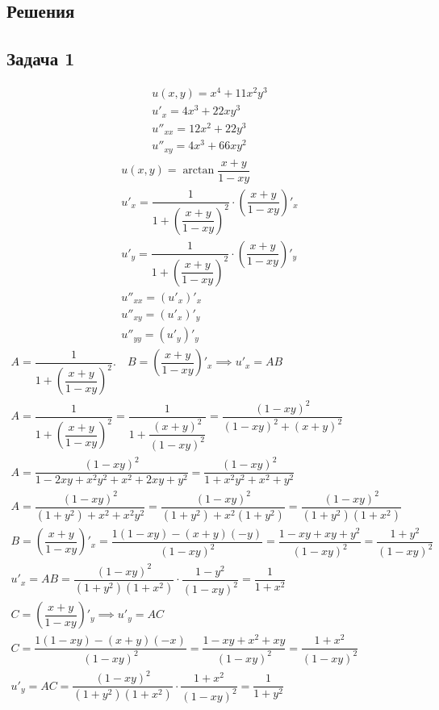 \documentclass[a4paper,fleqn,12pt]{article}
\theoremstyle{definition}
\begin{document}
\newpage
\subsection{Решения}

\subsection*{Задача 1}
\begin{gather*}
u(x,y) = x^4 + 11x^2y^3 \\
u'_x = 4x^3 + 22xy^3 \\
u''_{xx} = 12x^2 + 22y^3 \\
u''_{xy} = 4x^3 + 66xy^2 
\end{gather*}
\begin{gather*}
u(x,y) = \arctan{\dfrac{x+y}{1-xy}}\\
u'_x = \dfrac{1}{1 + \left( \dfrac{x+y}{1-xy} \right)^2} \cdot  \left( \dfrac{x+y}{1-xy} \right)'_x\\
u'_y = \dfrac{1}{1 + \left( \dfrac{x+y}{1-xy} \right)^2} \cdot  \left( \dfrac{x+y}{1-xy} \right)'_y\\
u''_{xx} = (u'_x)'_x\\
u''_{xy} = (u'_x)'_y\\
u''_{yy} = (u'_y)'_y
\end{gather*}
\begin{gather*}
A = \dfrac{1}{1 + \left( \dfrac{x+y}{1-xy} \right)^2}. \quad B = \left( \dfrac{x+y}{1-xy} \right)'_x \implies u'_x = AB\\
A = \dfrac{1}{1 + \left( \dfrac{x+y}{1-xy} \right)^2} =\dfrac{1}{1 + \dfrac{(x+y)^2}{(1-xy)^2}} = \dfrac{(1-xy)^2}{(1-xy)^2 + (x+y)^2}\\ 
A = \dfrac{(1-xy)^2}{1 - 2xy + x^2y^2 + x^2 + 2xy + y^2} = \dfrac{(1-xy)^2}{1 + x^2y^2 + x^2 + y^2}\\
A = \dfrac{(1-xy)^2}{(1 + y^2) + x^2 + x^2y^2} = \dfrac{(1-xy)^2}{(1 + y^2) + x^2(1 +y^2)} = \dfrac{(1-xy)^2}{(1 + y^2) (1 + x^2)}\\
B = \left( \dfrac{x+y}{1-xy} \right)'_x = \dfrac{1(1-xy) - (x+y)(-y)}{(1 - xy)^2} = \dfrac {1-xy + xy + y^2}{(1 - xy)^2} =\dfrac {1+y^2}{(1 - xy)^2}  \\
u'_x = AB =  \dfrac{(1-xy)^2}{(1 + y^2) (1 + x^2)} \cdot \dfrac {1-y^2}{(1 - xy)^2} = \dfrac{1}{1 + x^2}\\
C = \left( \dfrac{x+y}{1-xy} \right)'_y \implies u'_y = AC\\
C = \dfrac{1(1 -xy) - (x+y)(-x)}{(1 - xy)^2} = \dfrac{1 -xy + x^2 +xy}{(1 - xy)^2} = \dfrac{1 + x^2}{(1 - xy)^2}\\
u'_y = AC = \dfrac{(1-xy)^2}{(1 + y^2) (1 + x^2)} \cdot \dfrac{1 + x^2}{(1 - xy)^2} = \dfrac{1}{1 + y^2}
\end{gather*}
\end{document}
